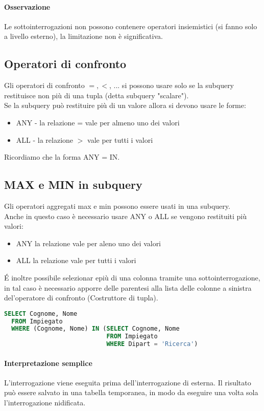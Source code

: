 \paragraph*{Osservazione} Le sottointerrogazioni non possono contenere operatori insiemistici (si fanno
solo a livello esterno), la limitazione non è significativa.
\subsection{Operatori di confronto}
Gli operatori di confronto $=, <$, ... si possono usare solo se la subquery restituisce
non più di una tupla (detta subquery "scalare").\\
Se la subquery può restituire più di un valore allora si devono usare le forme:
\begin{itemize}
  \item ANY - la relazione = vale per almeno uno dei valori
  \item ALL - la relazione $>$ vale per tutti i valori
\end{itemize}
Ricordiamo che la forma ANY = IN.
\subsection{MAX e MIN in subquery}
Gli operatori aggregati max e min possono essere usati in una subquery.\\
Anche in questo caso è necessario usare ANY o ALL se vengono restituiti più valori:
\begin{itemize}
  \item ANY la relazione vale per aleno uno dei valori
  \item ALL la relazione vale per tutti i valori
\end{itemize}
\'E inoltre possibile selezionar epiù di una colonna tramite una sottointerrogazione, 
in tal caso è necessario apporre delle parentesi alla lista delle colonne a sinistra
del'operatore di confronto (Costruttore di tupla).
\begin{lstlisting}[language=SQL]
  SELECT Cognome, Nome
  FROM Impiegato
  WHERE (Cognome, Nome) IN (SELECT Cognome, Nome
                            FROM Impiegato
                            WHERE Dipart = 'Ricerca')
\end{lstlisting}
\paragraph*{Interpretazione semplice} L'interrogazione viene eseguita prima dell'interrogazione
di esterna. Il risultato può essere salvato in una tabella temporanea, in modo da eseguire una volta 
sola l'interrogazione nidificata.

